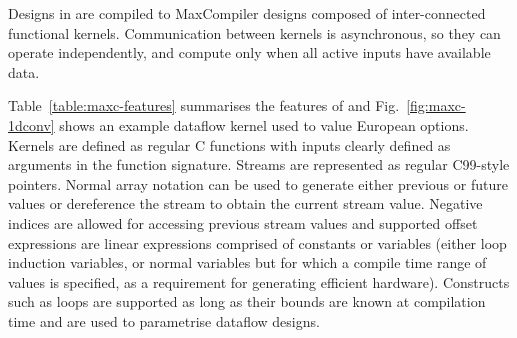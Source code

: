 Designs in \FAST{} are compiled to MaxCompiler designs composed of
inter-connected functional kernels. Communication between kernels is
asynchronous, so they can operate independently, and compute only when
all active inputs have available data.

Table~\ref{table:maxc-features} summarises the features of \FAST{} and
Fig.~\ref{fig:maxc-1dconv} shows an example dataflow kernel used to
value European options. Kernels are defined as regular C functions
with inputs clearly defined as arguments in the function
signature. Streams are represented as regular C99-style pointers.
Normal array notation can be used to generate either previous or
future values or dereference the stream to obtain the current stream
value. Negative indices are allowed for accessing previous stream
values and supported offset expressions are linear expressions
comprised of constants or variables (either loop induction variables,
or normal variables but for which a compile time range of values is
specified, as a requirement for generating efficient
hardware). Constructs such as loops are supported as long as their
bounds are known at compilation time and are used to parametrise
dataflow designs.

